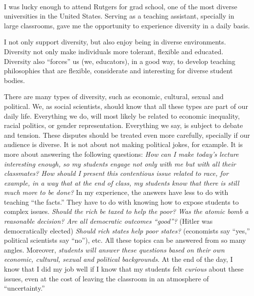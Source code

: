 \documentclass[10pt,stdletter,dateno,sigleft]{newlfm} %
\begin{document}
\begin{newlfm}




\vspace{-2cm}{\bf \huge Diversity Statement}\\

I was lucky enough to attend Rutgers for grad school, one of the most diverse universities in the United States. Serving as a teaching assistant, specially in large classrooms, gave me the opportunity to experience diversity in a daily basis. 

I not only support diversity, but also enjoy being in diverse environments. Diversity not only make individuals more tolerant, flexible and educated. Diversity also ``forces'' us (we, educators), in a good way, to develop teaching philosophies that are flexible, considerate and interesting for diverse student bodies. 

There are many types of diversity, such as economic, cultural, sexual and political. We, as social scientists, should know that all these types are part of our daily life. Everything we do, will most likely be related to economic inequality, racial politics, or gender representation. Everything we say, is subject to debate and tension. These disputes should be treated even more carefully, specially if our audience is diverse. It is not about not making political jokes, for example. It is more about answering the following questions: \emph{How can I make today's lecture interesting enough, so my students engage not only with me but with all their classmates? How should I present this contentious issue related to race, for example, in a way that at the end of class, my students know that there is still much more to be done?} In my experience, the answers have less to do with teaching ``the facts.'' They have to do with knowing how to expose students to complex issues. \emph{Should the rich be taxed to help the poor? Was the atomic bomb a reasonable decision? Are all democratic outcomes ``good''?} (Hitler was democratically elected) \emph{Should rich states help poor states?} (economists say ``yes,'' political scientists say ``no''), etc. All these topics can be answered from so many angles. Moreover, \emph{students will answer these questions based on their own economic, cultural, sexual and political backgrounds}. At the end of the day, I know that I did my job well if I know that my students felt \emph{curious} about these issues, even at the cost of leaving the classroom in an atmosphere of ``uncertainty.''


\end{newlfm}
\end{document}
